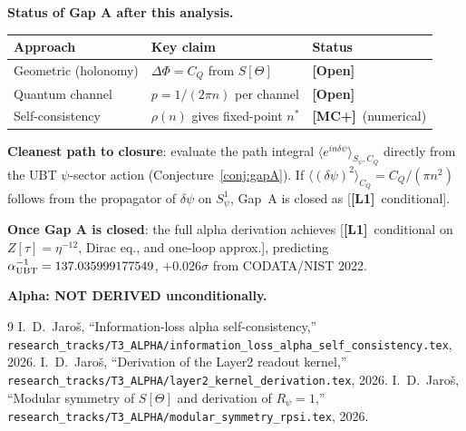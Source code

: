 \documentclass[12pt,a4paper]{article}
\theoremstyle{definition}\newtheorem{definition}[theorem]{Definition}
\theoremstyle{remark}\newtheorem{remark}[theorem]{Remark}
\newcommand{\Lo}{\textbf{[L1]}}
\newcommand{\MCp}{\textbf{[MC+]}}
\newcommand{\OPEN}{\textbf{[Open]}}
\begin{document}
\begin{resultbox}
\textbf{Status of Gap A after this analysis.}

\begin{center}
\renewcommand{\arraystretch}{1.3}
\begin{tabular}{lll}
\toprule
Approach & Key claim & Status \\
\midrule
Geometric (holonomy) & $\Delta\Phi = C_Q$ from $S[\Theta]$ & \OPEN \\
Quantum channel & $p = 1/(2\pi n)$ per channel & \OPEN \\
Self-consistency & $\rho(n)$ gives fixed-point $n^*$ & \MCp\ (numerical) \\
\bottomrule
\end{tabular}
\end{center}

\medskip
\textbf{Cleanest path to closure}: evaluate the path integral
$\langle e^{in\delta\psi}\rangle_{S_\psi, C_Q}$ directly from
the UBT $\psi$-sector action (Conjecture~\ref{conj:gapA}).
If $\langle(\delta\psi)^2\rangle_{C_Q} = C_Q/(\pi n^2)$ follows
from the propagator of $\delta\psi$ on $S^1_\psi$, Gap~A is
closed as [\Lo\ conditional].

\medskip
\textbf{Once Gap A is closed}: the full alpha derivation achieves
[\Lo\ conditional on $Z[\tau]=\eta^{-12}$, Dirac eq., and one-loop
approx.], predicting $\alpha^{-1}_{\rm UBT} = 137.035999177549$,
$+0.026\sigma$ from CODATA/NIST 2022.

\medskip
\textbf{Alpha: NOT DERIVED unconditionally.}
\end{resultbox}

\begin{thebibliography}{9}
  I.~D.~Jaroš,
  ``Information-loss alpha self-consistency,''
  \texttt{research\_tracks/T3\_ALPHA/information\_loss\_alpha\_self\_consistency.tex}, 2026.
  I.~D.~Jaroš,
  ``Derivation of the Layer2 readout kernel,''
  \texttt{research\_tracks/T3\_ALPHA/layer2\_kernel\_derivation.tex}, 2026.
  I.~D.~Jaroš,
  ``Modular symmetry of $S[\Theta]$ and derivation of $R_\psi=1$,''
  \texttt{research\_tracks/T3\_ALPHA/modular\_symmetry\_rpsi.tex}, 2026.
\end{thebibliography}

\ifdefined\INCLUDEMODE\else
\end{document}
